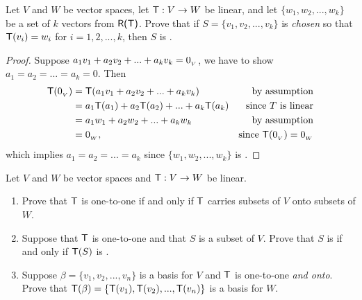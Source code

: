 \begin{exercise} \label{exercise 2.1.13}
Let \(V\) and \(W\) be vector spaces, let \(\textsf{T} : V \to W\) be linear, and let \(\{ w_1, w_2, ..., w_k \}\) be a \emph{\LID{}} set of \(k\) vectors from \(\textsf{R(T)}\).
Prove that if \(S = \{ v_1, v_2, ..., v_k \}\) is \emph{chosen} so that \(\textsf{T}(v_i) = w_i\) for \(i = 1, 2, ..., k\), then \(S\) is \emph{\LID{}}.
\end{exercise}

\begin{proof}
Suppose \(a_1 v_1 + a_2 v_2 + ... + a_k v_k = 0_{_V}\), we have to show \(a_1 = a_2 = ... = a_k = 0\).
Then
\begin{align*}
    \textsf{T}(0_{_V}) & = \textsf{T}(a_1 v_1 + a_2 v_2 + ... + a_k v_k) & \text{by assumption} \\
            & = a_1\textsf{T}(a_1) + a_2\textsf{T}(a_2) + ... + a_k\textsf{T}(a_k) & \text{since \(T\) is linear} \\
            & = a_1 w_1 + a_2 w_2 + ... + a_k w_k & \text{by assumption} \\
            & = 0_{_W}, & \text{since \(\textsf{T}(0_{_V}) = 0_{_W}\)}
\end{align*}
which implies \(a_1 = a_2 = ... = a_k\) since \(\{ w_1, w_2, ..., w_k \}\) is \LID{}.
\end{proof}

\begin{exercise} \label{exercise 2.1.14}
Let \(V\) and \(W\) be vector spaces and \(\textsf{T} : V \to W\) be linear.
\begin{enumerate}
\item Prove that \(\textsf{T}\) is one-to-one if and only if \(\textsf{T}\) carries \LID{} subsets of \(V\) onto \LID{} subsets of \(W\).
\item Suppose that \(\textsf{T}\) is one-to-one and that \(S\) is a subset of \(V\).
    Prove that \(S\) is \LID{} if and only if \(\textsf{T}(S)\) is \LID{}.
\item Suppose \(\beta = \{ v_1, v_2, ..., v_n \}\) is a basis for \(V\) and \(\textsf{T}\) is one-to-one \emph{and onto}.
    Prove that \(\textsf{T}(\beta) = \{ \textsf{T}(v_1), \textsf{T}(v_2), ..., \textsf{T}(v_n) \}\) is a basis for \(W\).
\end{enumerate}
\end{exercise}

